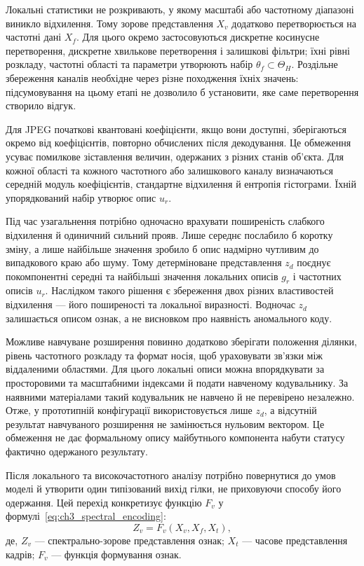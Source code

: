 Локальні статистики не розкривають, у якому масштабі або частотному діапазоні виникло відхилення. Тому зорове представлення $X_v$ додатково перетворюється на частотні дані $X_f$. Для цього окремо застосовуються дискретне косинусне перетворення, дискретне хвилькове перетворення і залишкові фільтри; їхні рівні розкладу, частотні області та параметри утворюють набір $\theta_f\subset\Theta_H$. Роздільне збереження каналів необхідне через різне походження їхніх значень: підсумовування на цьому етапі не дозволило б установити, яке саме перетворення створило відгук.

Для JPEG початкові квантовані коефіцієнти, якщо вони доступні, зберігаються окремо від коефіцієнтів, повторно обчислених після декодування. Це обмеження усуває помилкове зіставлення величин, одержаних з різних станів об’єкта. Для кожної області та кожного частотного або залишкового каналу визначаються середній модуль коефіцієнтів, стандартне відхилення й ентропія гістограми. Їхній упорядкований набір утворює опис $u_r$.

Під час узагальнення потрібно одночасно врахувати поширеність слабкого відхилення й одиничний сильний прояв. Лише середнє послабило б коротку зміну, а лише найбільше значення зробило б опис надмірно чутливим до випадкового краю або шуму. Тому детерміноване представлення $z_d$ поєднує покомпонентні середні та найбільші значення локальних описів $g_r$ і частотних описів $u_r$. Наслідком такого рішення є збереження двох різних властивостей відхилення --- його поширеності та локальної виразності. Водночас $z_d$ залишається описом ознак, а не висновком про наявність аномального коду.

Можливе навчуване розширення повинно додатково зберігати положення ділянки, рівень частотного розкладу та формат носія, щоб ураховувати зв’язки між віддаленими областями. Для цього локальні описи можна впорядкувати за просторовими та масштабними індексами й подати навченому кодувальнику. За наявними матеріалами такий кодувальник не навчено й не перевірено незалежно. Отже, у прототипній конфігурації використовується лише $z_d$, а відсутній результат навчуваного розширення не замінюється нульовим вектором. Це обмеження не дає формальному опису майбутнього компонента набути статусу фактично одержаного результату.

Після локального та високочастотного аналізу потрібно повернутися до умов моделі й утворити один типізований вихід гілки, не приховуючи способу його одержання. Цей перехід конкретизує функцію $F_v$ у формулі~\eqref{eq:ch3_spectral_encoding}:
\begin{equation}
Z_v=F_v(X_v,X_f,X_t),
\label{eq:ch3_spectral_encoding}
\end{equation}
де, $Z_v$ --- спектрально-зорове представлення ознак; $X_t$ --- часове представлення кадрів; $F_v$ --- функція формування ознак.

